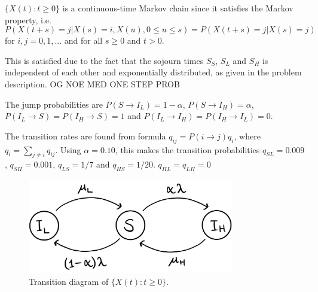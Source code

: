 $\{X(t):t \geq 0 \}$ is a continuous-time Markov chain since it satisfies the Markov property, i.e. 
$$P(X(t+s)=j|X(s)=i, X(u), 0 \leq u \leq s)=P(X(t+s)=j|X(s)=j)$$ 
for $i,j = 0,1,...$ and for all $s \geq 0$ and $t >0 $.

This is satisfied due to the fact that the sojourn times $S_S$, $S_L$ and $S_H$ is independent of each other and exponentially distributed, as given in the problem description.  OG NOE MED ONE STEP PROB

The jump probabilities are $P(S \rightarrow I_L)= 1 - \alpha$, $P(S \rightarrow I_H)= \alpha$, $P(I_L \rightarrow S)= P(I_H \rightarrow S) = 1$ and $P(I_L \rightarrow I_H)= P(I_H \rightarrow I_L) = 0$. 

The transition rates are found from formula $q_{ij} = P(i \rightarrow j ) q_i$, where $q_i = \sum_{j \neq i} q_{ij}$. Using $\alpha = 0.10$, this makes the transition probabilities $q_{SL} = 0.009$, $q_{SH} = 0.001$, $q_{LS} = 1/7$ and $q_{HS} = 1/20$. $q_{HL}=q_{LH}=0$ 

\begin{figure}
    \centering
    \includegraphics[width=90mm]{TransDiag1A.png}
    \caption{Transition diagram of $\{X(t):t\geq0\}$.}
    \label{plot_2a}
\end{figure}




